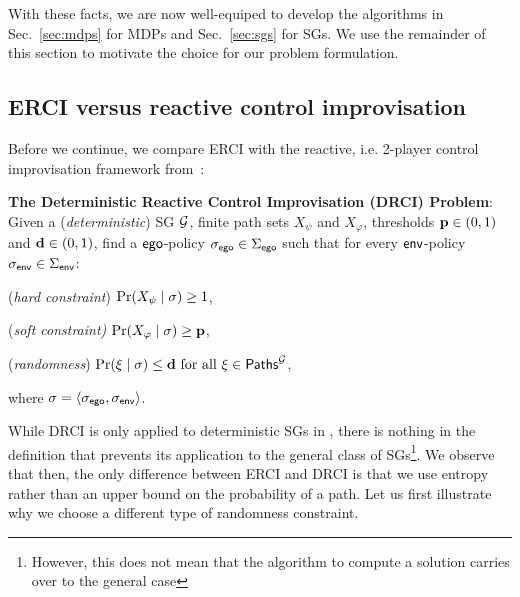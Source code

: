 With these facts, we are now well-equiped to develop the algorithms in Sec.~\ref{sec:mdps} for MDPs and Sec.~\ref{sec:sgs} for SGs.
We use the remainder of this section to motivate the choice for our problem formulation.

\subsection{ERCI versus reactive control improvisation}

Before we continue, we compare ERCI with the reactive, i.e. 2-player control improvisation framework from~\cite{}:
\begin{mdframed}
\textbf{The Deterministic Reactive Control Improvisation (DRCI) Problem}:
Given a (\emph{deterministic}) SG $\mathcal{G}$, finite path sets $X_\psi$ and $X_\varphi$,  thresholds $\mathbf{p} \in (0,1)$ and $\mathbf{d} \in (0,1)$,  find a $\mathsf{ego}$-policy ${\sigma_{\mathsf{ego}}} \in \Sigma_{\mathsf{ego}}$  such that for every $\mathsf{env}$-policy ${\sigma_{\mathsf{env}}} \in \Sigma_{\mathsf{env}}$: 
\begin{compactenum}
\item (\emph{hard constraint}) $\Pr(X_\psi \mid \sigma) \geq 1$,
	\item (\emph{soft constraint)} $\Pr(X_\varphi \mid \sigma) \geq \mathbf{p}$,
	\item (\emph{randomness}) $\Pr(\xi \mid \sigma) \leq \mathbf{d} \text{ for all } \xi \in \mathsf{Paths}^{\mathcal{G}}_{}$,
\end{compactenum}
where  $\sigma = \langle {\sigma_{\mathsf{ego}}}, {\sigma_{\mathsf{env}}} \rangle$.
\end{mdframed}
While DRCI is only applied to deterministic SGs in \cite{DBLP:conf/cav/FremontS18}, there is nothing in the definition that prevents its application to the general class of SGs\footnote{However, this does not mean that the algorithm to compute a solution carries over to the general case}.
We observe that then, the only difference between ERCI and DRCI is that we use entropy rather than an upper bound on the probability of a path.  Let us first illustrate why we choose a different type of randomness constraint.
